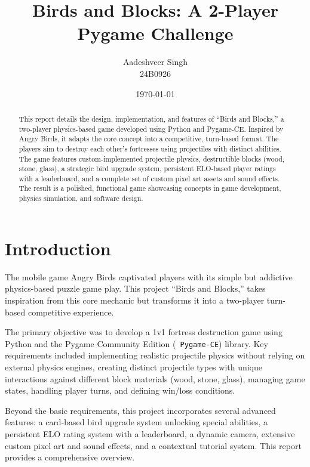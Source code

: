 \documentclass[11pt, a4paper]{article}
\title{Birds and Blocks: A 2-Player Pygame Challenge}
\author{Aadeshveer Singh \\ 24B0926}
\date{\today}
\begin{document}
\maketitle
\thispagestyle{empty}


\newpage

\begin{abstract}
\noindent This report details the design, implementation, and features of \enquote{Birds and Blocks,} a two-player physics-based game developed using Python and Pygame-CE. Inspired by Angry Birds, it adapts the core concept into a competitive, turn-based format. The players aim to destroy each other's fortresses using projectiles with distinct abilities. The game features custom-implemented projectile physics, destructible blocks (wood, stone, glass), a strategic bird upgrade system, persistent ELO-based player ratings with a leaderboard, and a complete set of custom pixel art assets and sound effects. The result is a polished, functional game showcasing concepts in game development, physics simulation, and software design.
\end{abstract}

\newpage

\tableofcontents

\newpage

\section{Introduction}
The mobile game Angry Birds captivated players with its simple but addictive physics-based puzzle game play. This project \enquote{Birds and Blocks,} takes inspiration from this core mechanic but transforms it into a two-player turn-based competitive experience.

The primary objective was to develop a 1v1 fortress destruction game using Python and the Pygame Community Edition (\texttt{ Pygame-CE}) library. Key requirements included implementing realistic projectile physics without relying on external physics engines, creating distinct projectile types with unique interactions against different block materials (wood, stone, glass), managing game states, handling player turns, and defining win/loss conditions.

Beyond the basic requirements, this project incorporates several advanced features: a card-based bird upgrade system unlocking special abilities, a persistent ELO rating system with a leaderboard, a dynamic camera, extensive custom pixel art and sound effects, and a contextual tutorial system. This report provides a comprehensive overview.
\end{document}
